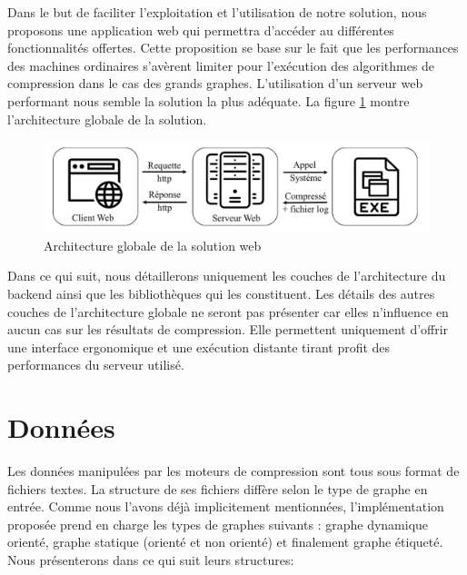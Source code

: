 	Dans le but de faciliter l'exploitation et l'utilisation de notre solution, nous proposons une application web qui permettra  d'accéder au différentes fonctionnalités offertes. Cette proposition se base sur le fait que les performances des machines ordinaires s'avèrent limiter pour l'exécution des algorithmes de compression dans le cas des grands graphes. L'utilisation d'un serveur web performant nous semble la solution la plus adéquate. La figure \ref{Img:archglob2} montre l'architecture globale de la solution.   	
	
\begin{figure}[H]
	\centering
	\label{Img:archglob2}
	\includegraphics[scale=0.35]{ressources/image/ArchGlob2.jpg}
	\caption{Architecture globale de la solution web}
 \end{figure}
 
 Dans ce qui suit, nous détaillerons uniquement les couches de l'architecture du backend ainsi que les bibliothèques qui les constituent. Les détails des autres couches de l'architecture globale ne seront pas présenter car elles n'influence en aucun cas sur les résultats de compression. Elle permettent uniquement d'offrir une interface ergonomique et une exécution distante tirant profit des performances du serveur utilisé.
	
	\section{Données}
	Les données manipulées par les moteurs de compression sont tous sous format de fichiers textes. La structure de ses fichiers diffère selon le type de graphe en entrée. Comme nous l'avons déjà implicitement mentionnées, l'implémentation proposée prend en charge les types de graphes suivants : graphe dynamique orienté, graphe statique (orienté et non orienté) et finalement graphe étiqueté. Nous présenterons dans ce qui suit leurs structures:
	
